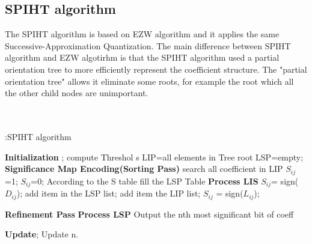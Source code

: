 \documentclass[twocolumn]{article}  %
\begin{document}
\subsection {SPIHT algorithm}
The SPIHT algorithm is based on EZW algorithm and it applies the same Successive-Approximation Quantization. The main difference between SPIHT algorithm and EZW algotirhm is that the SPIHT algorithm used a partial orientation tree to more efficiently represent the coefficient structure. The "partial orientation tree" allows it eliminate some roots, for example the root which all the other child nodes are unimportant. 
\\
\\
\\
\begin{algorithm}[!h]
  \caption{:SPIHT algorithm}
	\begin{algorithmic}
	\State \textbf{Initialization} ;
	\State compute Threshol s
	\State LIP=all elements in Tree root
	\State LSP=empty;
	\State \textbf{Significance Map Encoding(Sorting Pass)}
	\State search all coefficient in LIP
		\State $S_{ij}$=1;
	\Else
		\State $S_{ij}$=0;
	\EndIf
	\State According to the S table fill the LSP Table	
	\EndFor	
	\State \textbf{Process LIS}
		\State $S_{ij}$= sign($D_{ij}$);
			\State add item in the LSP list;
		\Else 
			\State add item the LIP list;
		\EndIf
		\State  $S_{ij}$ = sign($L_{ij}$);

	\EndIf
	\EndFor 
	\State \textbf{Refinement Pass}
	\State \textbf{Process LSP}
		\State Output the nth most significant bit of coeff
	\EndFor
	
	\State\textbf{Update};
	\State Update n.
    	\EndFor
	\end{algorithmic}
\end{algorithm} 
\end{document}
